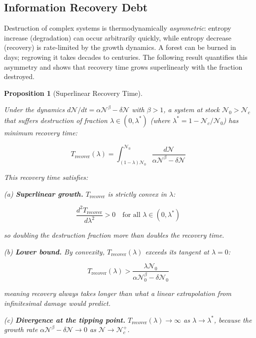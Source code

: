 \documentclass[11pt]{article}
\theoremstyle{plain}
\newtheorem{proposition}[theorem]{Proposition}
\theoremstyle{definition}
\theoremstyle{remark}
\let\origsubsection\subsection
\renewcommand{\subsection}{\needspace{7\baselineskip}\origsubsection}
\begin{document}
\subsection{Information Recovery Debt}\label{information-recovery-debt}

Destruction of complex systems is thermodynamically \emph{asymmetric}:
entropy increase (degradation) can occur arbitrarily quickly, while
entropy decrease (recovery) is rate-limited by the growth dynamics. A
forest can be burned in days; regrowing it takes decades to centuries.
The following result quantifies this asymmetry and shows that recovery
time grows superlinearly with the fraction destroyed.

\begin{proposition}[Superlinear Recovery Time]
\label{prop-superlinear-recovery-time}

Under the dynamics $d\mathcal{N}/dt = \alpha\mathcal{N}^\beta - \delta\mathcal{N}$ with $\beta > 1$, a system at stock $\mathcal{N}_0 > \mathcal{N}_c$ that suffers destruction of fraction $\lambda \in (0, \lambda^*)$ (where $\lambda^* = 1 - \mathcal{N}_c/\mathcal{N}_0$) has minimum recovery time:

$$T_{\text{recover}}(\lambda) = \int_{(1-\lambda)\mathcal{N}_0}^{\mathcal{N}_0} \frac{d\mathcal{N}}{\alpha\mathcal{N}^\beta - \delta\mathcal{N}}$$

This recovery time satisfies:

(a) \textbf{Superlinear growth.} $T_{\text{recover}}$ is strictly convex in $\lambda$:

$$\frac{d^2 T_{\text{recover}}}{d\lambda^2} > 0 \quad \text{for all } \lambda \in (0, \lambda^*)$$

so doubling the destruction fraction more than doubles the recovery time.

(b) \textbf{Lower bound.} By convexity, $T_{\text{recover}}(\lambda)$ exceeds its tangent at $\lambda = 0$:

$$T_{\text{recover}}(\lambda) > \frac{\lambda \mathcal{N}_0}{\alpha\mathcal{N}_0^\beta - \delta\mathcal{N}_0}$$

meaning recovery always takes longer than what a linear extrapolation from infinitesimal damage would predict.

(c) \textbf{Divergence at the tipping point.} $T_{\text{recover}}(\lambda) \to \infty$ as $\lambda \to \lambda^*$, because the growth rate $\alpha\mathcal{N}^\beta - \delta\mathcal{N} \to 0$ as $\mathcal{N} \to \mathcal{N}_c^+$.
\end{proposition}
\end{document}
